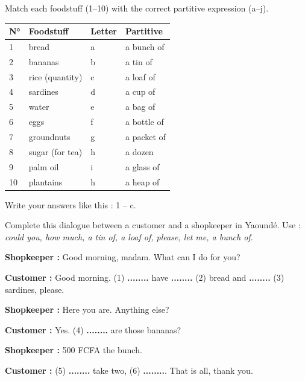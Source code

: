 \documentclass[11pt]{article}
\begin{document}
\begin{exercice}
Match each foodstuff (1--10) with the correct partitive expression (a--j).

\begin{center}
\begin{tabularx}{\linewidth}{|l|X|l|X|}
\hline
\rowcolor{popblueL} \textbf{N°} & \textbf{Foodstuff} & \textbf{Letter} & \textbf{Partitive} \\
\hline
1 & bread & a & a bunch of \\
\hline
2 & bananas & b & a tin of \\
\hline
3 & rice (quantity) & c & a loaf of \\
\hline
4 & sardines & d & a cup of \\
\hline
5 & water & e & a bag of \\
\hline
6 & eggs & f & a bottle of \\
\hline
7 & groundnuts & g & a packet of \\
\hline
8 & sugar (for tea) & h & a dozen \\
\hline
9 & palm oil & i & a glass of \\
\hline
10 & plantains & h & a heap of \\
\hline
\end{tabularx}
\end{center}

Write your answers like this : 1 -- c.
\end{exercice}

\begin{exercice}
Complete this dialogue between a customer and a shopkeeper in Yaoundé. Use : \emph{could you, how much, a tin of, a loaf of, please, let me, a bunch of}.

\textbf{Shopkeeper :} Good morning, madam. What can I do for you?

\textbf{Customer :} Good morning. (1) \textbf{........} have \textbf{........} (2) bread and \textbf{........} (3) sardines, please.

\textbf{Shopkeeper :} Here you are. Anything else?

\textbf{Customer :} Yes. (4) \textbf{........} are those bananas?

\textbf{Shopkeeper :} 500 FCFA the bunch.

\textbf{Customer :} (5) \textbf{........} take two, (6) \textbf{........}. That is all, thank you.
\end{exercice}
\end{document}
